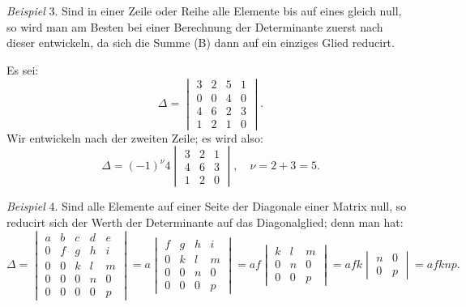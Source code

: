 
\textit{Beispiel} 3. Sind in einer Zeile oder Reihe alle Elemente bis auf
eines gleich null, so wird man am Besten bei einer Berechnung der
Determinante zuerst nach dieser entwickeln, da sich die Summe (B) dann auf
ein einziges Glied reducirt.

Es sei:
\[
\Delta=\begin{vmatrix} 3 & 2 & 5 & 1 \\ 0 & 0 & 4 & 0 \\ 4 & 6 & 2 & 3 \\ 1 & 2 & 1 & 0 \end{vmatrix}.
\]
Wir entwickeln nach der zweiten Zeile; es wird also:
\[
\Delta=(-1)^\nu 4\begin{vmatrix} 3 & 2 & 1 \\ 4 & 6 & 3 \\ 1 & 2 & 0 \end{vmatrix}, \quad \nu=2+3=5.
\]

\textit{Beispiel} 4. Sind alle Elemente auf einer Seite der Diagonale einer
Matrix null, so reducirt sich der Werth der Determinante auf das
Diagonalglied; denn man hat:
\[
\Delta=\begin{vmatrix}
a & b & c & d & e \\
0 & f & g & h & i \\
0 & 0 & k & l & m \\
0 & 0 & 0 & n & 0 \\
0 & 0 & 0 & 0 & p
\end{vmatrix}
=a\begin{vmatrix} f & g & h & i \\ 0 & k & l & m \\ 0 & 0 & n & 0 \\ 0 & 0 & 0 & p \end{vmatrix}
=af\begin{vmatrix} k & l & m \\ 0 & n & 0 \\ 0 & 0 & p \end{vmatrix}
=afk\begin{vmatrix} n & 0 \\ 0 & p \end{vmatrix}
=afknp.
\]

